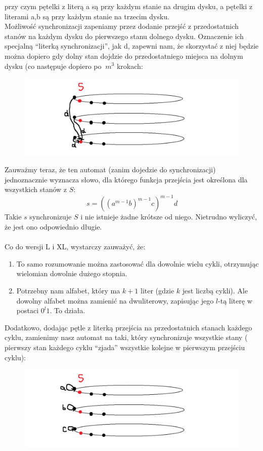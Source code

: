 \documentclass[a4paper,11pt]{article}
\begin{document}
przy czym pętelki z literą a są przy każdym stanie na drugim dysku, a pętelki z literami a,b są przy każdym stanie na trzecim
dysku. \\
Możliwość synchronizacji zapeniamy przez dodanie przejść z przedostatnich stanów na każdym dysku do pierwszego stanu 
dolnego dysku. Oznaczenie ich specjalną ``literką synchronizacji'', jak d, zapewni nam, że skorzystać z niej będzie można
dopiero gdy dolny stan dojdzie do przedostatniego miejsca na dolnym dysku (co następuje dopiero po $~m^3$ krokach: \\
\begin{figure}[h!]
  \centerline{%
    \includegraphics[width=18cm]{zad42_3.png}%
  }%
\end{figure}

Zauważmy teraz, że ten automat (zanim dojedzie do synchronizacji) jednoznacznie wyznacza słowo, dla którego funkcja przejścia 
jest określona dla wszystkich stanów z $S$:
$$
s = ((a^{m-1}b)^{m-1}c)^{m-1}d
$$
Takie $s$ synchronizuje $S$ i nie istnieje żadne krótsze od niego. Nietrudno wyliczyć, że jest ono odpowiednio długie. \\ \\

Co do wersji L i XL, wystarczy zauważyć, że:
\begin{enumerate}
 \item To samo rozumowanie można zastosować dla dowolnie wielu cykli, otrzymując wielomian dowolnie dużego stopnia.
 \item Potrzebny nam alfabet, który ma $k+1$ liter (gdzie $k$ jest liczbą cykli). Ale dowolny alfabet można zamienić na
 dwuliterowy, zapisując jego $l$-tą literę w postaci $0^l1$. To działa.
\end{enumerate}

Dodatkowo, dodając pętle z literką przejścia na przedostatnich stanach każdego cyklu, zamienimy nasz automat na taki, który
synchronizuje wszystkie stany ( pierwszy stan każdego cyklu ``zjada'' wszystkie kolejne w pierwszym przejściu cyklu):
\begin{figure}[h!]
  \centerline{%
    \includegraphics[width=18cm]{zad42_4.png}%
  }%
\end{figure}
\end{document}
